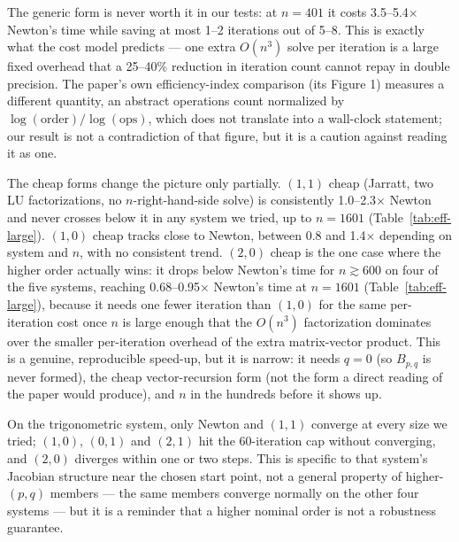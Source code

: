 \documentclass[sigconf,nonacm]{acmart}
\begin{document}
The generic form is never worth it in our tests: at $n=401$ it costs 3.5--5.4$\times$ Newton's
time while saving at most 1--2 iterations out of 5--8. This is exactly what the cost model
predicts --- one extra $O(n^3)$ solve per iteration is a large fixed overhead that a 25--40\%
reduction in iteration count cannot repay in double precision. The paper's own efficiency-index
comparison (its Figure 1) measures a different quantity, an abstract operations count normalized
by $\log(\text{order})/\log(\text{ops})$, which does not translate into a wall-clock statement;
our result is not a contradiction of that figure, but it is a caution against reading it as one.

The cheap forms change the picture only partially. $(1,1)$ cheap (Jarratt, two LU
factorizations, no $n$-right-hand-side solve) is consistently 1.0--2.3$\times$ Newton and never
crosses below it in any system we tried, up to $n=1601$ (Table~\ref{tab:eff-large}). $(1,0)$
cheap tracks close to Newton, between 0.8 and 1.4$\times$ depending on system and $n$, with no
consistent trend. $(2,0)$ cheap is the one case where the higher order actually wins: it drops
below Newton's time for $n\gtrsim600$ on four of the five systems, reaching 0.68--0.95$\times$
Newton's time at $n=1601$ (Table~\ref{tab:eff-large}), because it needs one fewer iteration than
$(1,0)$ for the same per-iteration cost once $n$ is large enough that the $O(n^3)$ factorization
dominates over the smaller per-iteration overhead of the extra matrix-vector product. This is a
genuine, reproducible speed-up, but it is narrow: it needs $q=0$ (so $B_{p,q}$ is never formed),
the cheap vector-recursion form (not the form a direct reading of the paper would produce), and
$n$ in the hundreds before it shows up.

\begin{table}[t]
\caption{Cheap forms at large $n$ (801 and 1601 shown; 601 and 1201 follow the same trend):
iterations / median time (ms); figure in parentheses is time relative to Newton at the same
$n$.}
\label{tab:eff-large}
\footnotesize
\setlength{\tabcolsep}{4pt}

\end{table}

On the trigonometric system, only Newton and $(1,1)$ converge at every size we tried; $(1,0)$,
$(0,1)$ and $(2,1)$ hit the 60-iteration cap without converging, and $(2,0)$ diverges within one
or two steps. This is specific to that system's Jacobian structure near the chosen start point,
not a general property of higher-$(p,q)$ members --- the same members converge normally on the
other four systems --- but it is a reminder that a higher nominal order is not a robustness
guarantee.
\end{document}
